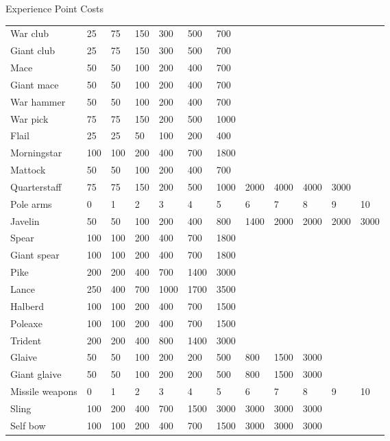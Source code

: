 \begin{Tables}{Experience Point Costs}
\begin{tabularx}{\linewidth}{Xlllllllllll}
War club		& 25	& 75 	& 150	& 300	& 500	& 700	& 	& 	& 	& 	&  \\
Giant club		& 25	& 75 	& 150	& 300	& 500	& 700	& 	& 	& 	& 	&  \\
Mace			& 50	& 50 	& 100	& 200	& 400	& 700	& 	& 	& 	& 	&  \\
Giant mace		& 50	& 50 	& 100	& 200	& 400	& 700	& 	& 	& 	& 	&  \\
War hammer		& 50	& 50 	& 100	& 200	& 400	& 700	& 	& 	& 	& 	&  \\
War pick		& 75	& 75 	& 150	& 200	& 500	& 1000	& 	& 	& 	& 	&  \\
Flail			& 25	& 25 	& 50	& 100	& 200	& 400	& 	& 	& 	& 	&  \\
Morningstar		& 100	& 100 	& 200	& 400	& 700	& 1800	& 	& 	& 	& 	&  \\
Mattock			& 50	& 50 	& 100	& 200	& 400	& 700	& 	& 	& 	& 	&  \\
Quarterstaff		& 75	& 75 	& 150	& 200	& 500	& 1000	& 2000	& 4000	& 4000	& 3000	&  \\ \hline
Pole arms		& 0	& 1 	& 2	& 3	& 4	& 5	& 6	& 7	& 8	& 9	& 10 \\ \hline
Javelin			& 50	& 50 	& 100	& 200	& 400	& 800	& 1400	& 2000	& 2000	& 2000	& 3000 \\
Spear			& 100	& 100 	& 200	& 400	& 700	& 1800	& 	& 	& 	& 	&  \\
Giant spear		& 100	& 100 	& 200	& 400	& 700	& 1800	& 	& 	& 	& 	&  \\
Pike			& 200	& 200 	& 400	& 700	& 1400	& 3000	& 	& 	& 	& 	&  \\
Lance			& 250	& 400 	& 700	& 1000	& 1700	& 3500	& 	& 	& 	& 	&  \\
Halberd			& 100	& 100 	& 200	& 400	& 700	& 1500	& 	& 	& 	& 	&  \\
Poleaxe			& 100	& 100 	& 200	& 400	& 700	& 1500	& 	& 	& 	& 	&  \\
Trident			& 200	& 200 	& 400	& 800 	& 1400	& 3000	& 	& 	& 	& 	&  \\
Glaive			& 50	& 50	& 100	& 200	& 200	& 500	& 800	& 1500	& 3000	& 	&  \\
Giant glaive		& 50	& 50	& 100	& 200	& 200	& 500	& 800	& 1500	& 3000	& 	&  \\ \hline
Missile weapons		& 0	& 1 	& 2	& 3	& 4	& 5	& 6	& 7	& 8	& 9	& 10 \\ \hline
Sling			& 100	& 200 	& 400	& 700	& 1500	& 3000	& 3000	& 3000	& 3000	& 	&  \\
Self bow		& 100	& 100 	& 200	& 400	& 700	& 1500	& 3000	& 3000	& 3000	& 	&  \\

\end{tabularx}
\end{Tables}
